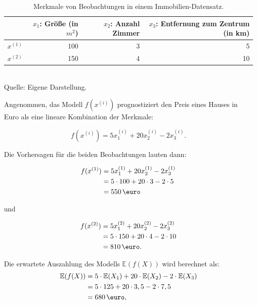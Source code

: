 \begin{table}[!h]
    \caption{Merkmale von Beobachtungen in einem Immobilien-Datensatz.}
    \footnotesize
    \begin{tabularx}{\textwidth}{Xrrr}
    \toprule
     & $x_1$: Größe (in $m^2$) &  $x_2$: Anzahl Zimmer &  $x_3$: Entfernung zum Zentrum (in km) \\
    \midrule
    $x^{(1)}$ & 100 & 3 & 5 \\
    $x^{(2)}$ & 150 & 4 & 10 \\
    \bottomrule
    \end{tabularx}
    \label{tab:example}
    \normalsize\\
    Quelle: Eigene Darstellung.
\end{table}

Angenommen, das Modell $f(x^{(i)})$ prognostiziert den Preis eines Hauses in Euro als eine lineare Kombination der Merkmale:

\begin{equation}
    f(x^{(i)}) = 5x_1^{(i)} + 20x_2^{(i)} - 2x_3^{(i)}.
\end{equation}

Die Vorhersagen für die beiden Beobachtungen lauten dann:

\begin{align}
    \label{eq:fx1}
    f(x^{(1)}) &= 5x_1^{(1)} + 20x_2^{(1)} - 2x_3^{(1)} \\ \notag
        &= 5 \cdot 100 + 20 \cdot 3 - 2 \cdot 5 \\ \notag
        &= 550\,\text{\euro} 
\end{align}

und 

\begin{align}
    f(x^{(2)}) &= 5x_1^{(2)} + 20x_2^{(2)} - 2x_3^{(2)} \\ \notag
        &= 5 \cdot 150 + 20 \cdot 4 - 2 \cdot 10 \\ \notag
        &= 810\,\text{\euro}. 
\end{align}

Die erwartete Auszahlung des Modells $\mathbb{E}(f(X))$ wird berechnet als:
\begin{align}
    \label{eq:efx}
    \mathbb{E}(f(X)) &= 5 \cdot \mathbb{E}(X_1) + 20 \cdot \mathbb{E}(X_2) - 2 \cdot \mathbb{E}(X_3) \\ \notag
                     &= 5 \cdot 125 + 20 \cdot 3,5 - 2 \cdot 7,5 \\ \notag
                     &= 680 \,\text{\euro},
\end{align}

